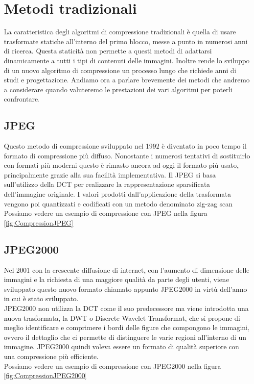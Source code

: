 \chapter{Metodi tradizionali}
La caratteristica degli algoritmi di compressione tradizionali è quella di usare trasformate statiche all’interno del primo blocco, messe a punto in numerosi anni di ricerca. Questa staticità non permette a questi metodi di adattarsi dinamicamente a tutti i tipi di contenuti delle immagini. Inoltre rende lo sviluppo di un nuovo algoritmo di compressione un processo lungo che richiede anni di studi e progettazione. \cite{ cheng2018deep}
Andiamo ora a parlare brevemente dei metodi che andremo a considerare quando valuteremo le prestazioni dei vari algoritmi per poterli confrontare.

\section{JPEG}
Questo metodo di compressione sviluppato nel 1992 è diventato in poco tempo il formato di compressione più diffuso. Nonostante i numerosi tentativi di sostituirlo con formati più moderni questo è rimasto ancora ad oggi il formato più usato, principalmente grazie alla sua facilità implementativa. Il JPEG si basa sull’utilizzo della DCT per realizzare la rappresentazione sparsificata dell’immagine originale. I valori prodotti dall'applicazione della trasformata vengono poi quantizzati e codificati con un metodo denominato zig-zag scan \cite{ 125072} \\
Possiamo vedere un esempio di compressione con JPEG nella figura \ref{fig:CompressionJPEG}

\section{JPEG2000}
Nel 2001 con la crescente diffusione di internet, con l’aumento di dimensione delle immagini e la richiesta di una maggiore qualità da parte degli utenti, viene sviluppato questo nuovo formato chiamato appunto JPEG2000 in virtù dell'anno in cui è stato sviluppato.\\
JPEG2000 non utilizza la DCT come il suo predecessore ma viene introdotta una nuova trasformata, la DWT o Discrete Wavelet Transformat, che si propone di meglio identificare e comprimere i bordi delle figure che compongono le immagini, ovvero il dettaglio che ci permette di distinguere le varie regioni all'interno di un immagine.
JPEG2000 quindi voleva essere un formato di qualità superiore con una compressione più efficiente.\cite{952804}\\
Possiamo vedere un esempio di compressione con JPEG2000 nella figura \ref{fig:CompressionJPEG2000}

